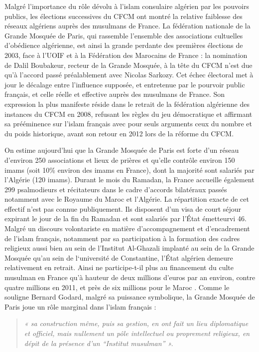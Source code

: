 Malgré l'importance du rôle dévolu à l'islam consulaire algérien par les
pouvoirs publics, les élections successives du CFCM ont montré la
relative faiblesse des réseaux algériens auprès des musulmans de France.
La fédération nationale de la Grande Mosquée de Paris, qui rassemble
l'ensemble des associations cultuelles d'obédience algérienne, est ainsi
la grande perdante des premières élections de 2003, face à l'UOIF et à
la Fédération des Marocains de France : la nomination de Dalil
Boubakeur, recteur de la Grande Mosquée, à la tête du CFCM n'est due
qu'à l'accord passé préalablement avec Nicolas Sarkozy. Cet échec
électoral met à jour le décalage entre l'influence supposée, et
entretenue par le pourvoir public français, et celle réelle et effective
auprès des musulmans de France. Son expression la plus manifeste réside
dans le retrait de la fédération algérienne des instances du CFCM en
2008, refusant les règles du jeu démocratique et affirmant sa
prééminence sur l'islam français avec pour seuls arguments ceux du
nombre et du poids historique, avant son retour en 2012 lors de la
réforme du CFCM.

On estime aujourd'hui que la Grande Mosquée de Paris est forte d'un
réseau d'environ 250 associations et lieux de prières et qu'elle
contrôle environ 150 imams (soit 10\% environ des imams en France), dont
la majorité sont salariés
par l'Algérie (120 imams). Durant le mois du Ramadan, la France
accueille également 299 psalmodieurs et récitateurs dans le cadre
d'accords bilatéraux passés notamment avec le Royaume du Maroc et
l'Algérie. La répartition exacte de cet effectif n'est pas connue
publiquement. Ils disposent d'un visa de court séjour expirant le jour
de la fin du Ramadan et sont salariés par l'État émetteurvi 46. Malgré
un discours volontariste en matière d'accompagnement et d'encadrement de
l'islam français, notamment par sa participation à la formation des
cadres religieux aussi bien au sein de l'Institut Al-Ghazali implanté au
sein de la Grande Mosquée qu'au sein de l`université de Constantine,
l'État algérien demeure relativement en retrait. Ainsi ne participe-t-il
plus au financement du culte musulman en France qu'à hauteur de deux
millions d'euros par an environ, contre quatre millions en 2011, et près
de six millions pour le Maroc . Comme le souligne Bernard Godard,
malgré sa puissance symbolique, la Grande Mosquée de Paris joue un rôle
marginal dans l'islam français :
\begin{quote}
    \emph{« sa construction même, puis sa
gestion, en ont fait un lieu diplomatique et officiel, mais nullement un
pôle intellectuel ou proprement religieux, en dépit de la présence d'un
``Institut musulman'' »}\emph{.}
\end{quote}

